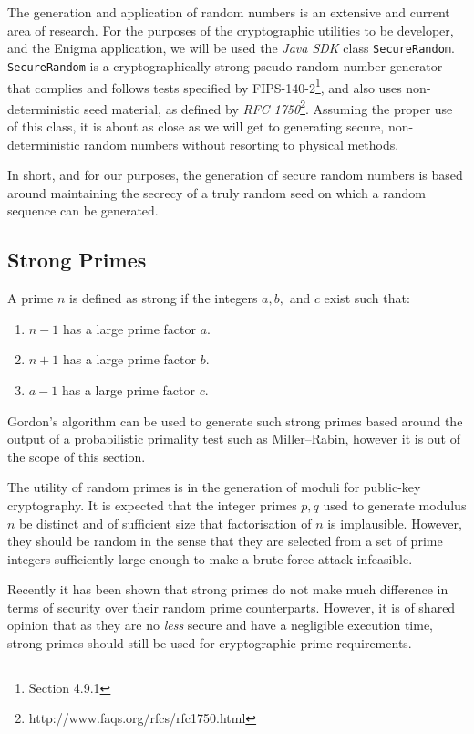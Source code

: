     The generation and application of random numbers is an extensive and current area of research. For the purposes of the cryptographic utilities to be developer, and the Enigma application, we will be used the \emph{Java SDK} class \verb!SecureRandom!. \verb!SecureRandom! is a cryptographically strong pseudo-random number generator that complies and follows tests specified by FIPS-140-2\footnote{Section 4.9.1}, and also uses non-deterministic seed material, as defined by \emph{RFC 1750}\footnote{http://www.faqs.org/rfcs/rfc1750.html}. Assuming the proper use of this class, it is about as close as we will get to generating secure, non-deterministic random numbers without resorting to physical methods.
    
    In short, and for our purposes, the generation of secure random numbers is based around maintaining the secrecy of a truly random seed on which a random sequence can be generated.
    
  \subsection{Strong Primes}
  
  A prime $n$ is defined as strong if the integers $a,b,$ and $c$ exist such that:
  
  \begin{enumerate}
    \item $n - 1$ has a large prime factor $a$.
    \item $n + 1$ has a large prime factor $b$.
    \item $a - 1$ has a large prime factor $c$.
  \end{enumerate}
  
  Gordon's algorithm can be used to generate such strong primes based around the output of a probabilistic primality test such as Miller--Rabin, however it is out of the scope of this section.
  
  The utility of random primes is in the generation of moduli for public-key cryptography. It is expected that the integer primes $p,q$ used to generate modulus $n$ be distinct and of sufficient size that factorisation of $n$ is implausible. However, they should be random in the sense that they are selected from a set of prime integers sufficiently large enough to make a brute force attack infeasible.
  
  Recently it has been shown that strong primes do not make much difference in terms of security over their random prime counterparts. However, it is of shared opinion that as they are no \emph{less} secure and have a negligible execution time, strong primes should still be used for cryptographic prime requirements.
  
